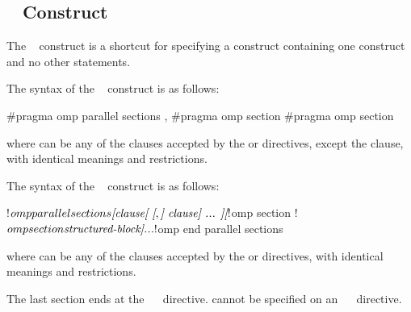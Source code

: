 \subsection{~ Construct}
\label{subsec:parallel sections Construct}
\summary
The ~ construct is a shortcut for specifying a 
construct containing one  construct and no other statements.

\syntax
\begin{ccppspecific}
The syntax of the ~ construct is as follows:

\begin{ompcPragma}
#pragma omp parallel sections \plc{[clause[ [},\plc{] clause] ... ] new-line}
    {
    \plc{[}#pragma omp section \plc{new-line]}
    \plc{[}#pragma omp section 
        \plc{structured-block]}
    }
\end{ompcPragma}

where  can be any of the clauses accepted by the  or 
directives, except the  clause, with identical meanings and restrictions.
\end{ccppspecific}

\begin{fortranspecific}
The syntax of the ~ construct is as follows:

\begin{ompfPragma}
!$omp parallel sections \plc{[clause[ [},\plc{] clause] ... ]}
    \plc{[}!$omp section\plc{]}
    \plc{[}!$omp section
        \plc{structured-block]}
    \plc{...}
!$omp end parallel sections
\end{ompfPragma}

where  can be any of the clauses accepted by the  or 
directives, with identical meanings and restrictions.

The last section ends at the ~~ directive.  cannot be
specified on an ~~ directive.
\end{fortranspecific}

